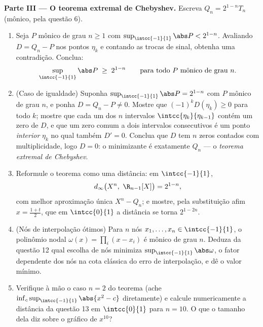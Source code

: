 \begin{problem}
\medskip
\noindent\textbf{Parte III --- O teorema extremal de Chebyshev.}
Escreva $Q_n = 2^{1-n}T_n$ (mônico, pela questão 6).
\begin{enumerate}[resume]
  \item Seja $P$ mônico de grau $n \geq 1$ com
        $\sup_{\intcc{-1}{1}}\abs P < 2^{1-n}$. Avaliando $D
        = Q_n - P$ nos pontos $\eta_k$ e contando as trocas
        de sinal, obtenha uma contradição. Conclua:
        \[
        \sup_{\intcc{-1}{1}}\abs P \;\geq\; 2^{1-n}
        \qquad\text{para todo } P \text{ mônico de grau } n.
        \]
  \item (Caso de igualdade) Suponha $\sup_{\intcc{-1}{1}}\abs P =
        2^{1-n}$ com $P$ mônico de grau $n$, e ponha $D = Q_n
        - P \neq 0$. Mostre que $(-1)^kD(\eta_k) \geq 0$ para todo $k$;
        mostre que cada um dos $n$ intervalos
        $\intcc{\eta_{k}}{\eta_{k-1}}$ contém um zero de $D$,
        e que um zero comum a dois intervalos consecutivos é
        um ponto \emph{interior} $\eta_k$ no qual também $D' = 0$.
        Conclua que $D$ tem $n$ zeros contados com
        multiplicidade, logo $D = 0$: o minimizante é exatamente
        $Q_n$ --- o \emph{teorema extremal de Chebyshev}.
  \item Reformule o teorema como uma distância: em $\intcc{-1}{1}$,
        \[
        d_\infty\bigl(X^n,\ \R_{n-1}[X]\bigr) = 2^{1-n},
        \]
        com melhor aproximação única $X^n - Q_n$; e mostre, pela
        substituição afim $x = \frac{1+t}2$, que em
        $\intcc{0}{1}$ a distância se torna $2^{1-2n}$.
  \item (Nós de interpolação ótimos) Para $n$ nós $x_1, \dots,
        x_n \in \intcc{-1}{1}$, o polinômio nodal
        $\omega(x) = \prod_i(x - x_i)$ é mônico de grau $n$.
        Deduza da questão 12 qual escolha de nós minimiza
        $\sup_{\intcc{-1}{1}}\abs\omega$, o fator dependente dos nós
        na cota clássica do erro de interpolação, e
        dê o valor mínimo.
  \item Verifique à mão o caso $n = 2$ do teorema (ache
        $\inf_c \sup_{\intcc{-1}{1}}\abs{x^2 - c}$ diretamente)
        e calcule numericamente a distância da questão 13 em
        $\intcc{0}{1}$ para $n = 10$. O que o tamanho dela diz
        sobre o gráfico de $x^{10}$?
\end{enumerate}


\end{problem}
